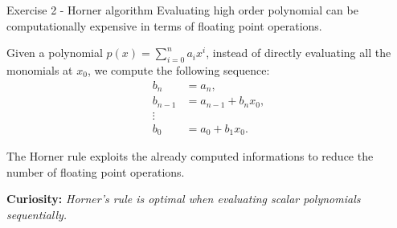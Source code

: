 \documentclass[10pt,aspectratio=169]{beamer}
\begin{document}
\begin{frame}{Exercise 2 - Horner algorithm}
	Evaluating high order polynomial can be computationally expensive in terms of floating point operations. \\
	
	\medskip
	
Given a polynomial $\displaystyle p(x) = \sum_{i=0}^{n} a_i x^i$, instead of directly evaluating all the monomials at $x_0$, we compute the following sequence:
\begin{equation*} 
\begin{aligned}
	b_n &= a_n, \\
	b_{n-1} &= a_{n-1} + b_n x_0, \\
	\vdots \\
	b_{0} &= a_{0} + b_1 x_0.
\end{aligned}
\end{equation*}

	The Horner rule exploits the already computed informations to reduce the number of floating point operations.\\
	
	\medskip
	
	\textbf{Curiosity:} \textit{ Horner's rule is optimal when evaluating scalar polynomials sequentially.}
\end{frame}
\end{document}
